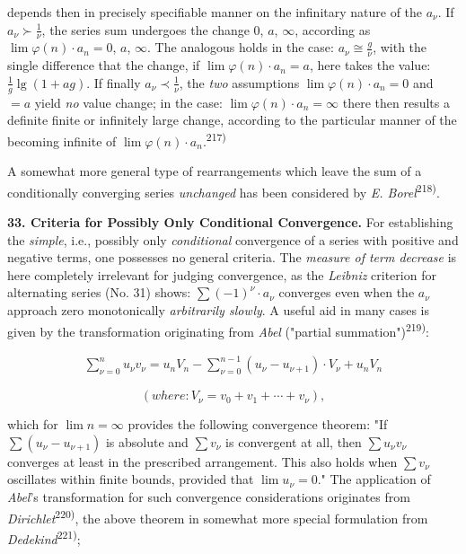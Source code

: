 \thispagestyle{fancy}

\vspace{0.5cm}

depends then in precisely specifiable manner on the infinitary nature of the $a_\nu$. If $a_\nu \succ \frac{1}{\nu}$, the series sum undergoes the change $0$, $a$, $\infty$, according as $\lim \varphi(n) \cdot a_n = 0$, $a$, $\infty$. The analogous holds in the case: $a_\nu \cong \frac{g}{\nu}$, with the single difference that the change, if $\lim \varphi(n) \cdot a_n = a$, here takes the value: $\frac{1}{g} \lg(1 + ag)$. If finally $a_\nu \prec \frac{1}{\nu}$, the \textit{two} assumptions $\lim \varphi(n) \cdot a_n = 0$ and $= a$ yield \textit{no} value change; in the case: $\lim \varphi(n) \cdot a_n = \infty$ there then results a definite finite or infinitely large change, according to the particular manner of the becoming infinite of $\lim \varphi(n) \cdot a_n$.\textsuperscript{217)}

A somewhat more general type of rearrangements which leave the sum of a conditionally converging series \textit{unchanged} has been considered by \textit{E. Borel}\textsuperscript{218)}.

\vspace{0.3cm}
\textbf{33. Criteria for Possibly Only Conditional Convergence.} For establishing the \textit{simple}, i.e., possibly only \textit{conditional} convergence of a series with positive and negative terms, one possesses no general criteria. The \textit{measure of term decrease} is here completely irrelevant for judging convergence, as the \textit{Leibniz} criterion for alternating series (No. 31) shows: $\sum (-1)^\nu \cdot a_\nu$ converges even when the $a_\nu$ approach zero monotonically \textit{arbitrarily slowly}. A useful aid in many cases is given by the transformation originating from \textit{Abel} ("partial summation")\textsuperscript{219)}:

\vspace{-0.5cm}
\begin{align}
    \sum_{\nu=0}^{n} u_\nu v_\nu = u_n V_n - \sum_{\nu=0}^{n-1} (u_{\nu} - u_{\nu+1}) \cdot V_\nu + u_n V_n
\end{align}

\vspace{-0.3cm}
$$(where: V_\nu = v_0 + v_1 + \cdots + v_\nu),$$ 

which for $\lim n = \infty$ provides the following convergence theorem: "If $\sum (u_\nu - u_{\nu+1})$ is absolute and $\sum v_\nu$ is convergent at all, then $\sum u_\nu v_\nu$ converges at least in the prescribed arrangement. This also holds when $\sum v_\nu$ oscillates within finite bounds, provided that $\lim u_\nu = 0$." The application of \textit{Abel}'s transformation for such convergence considerations originates from \textit{Dirichlet}\textsuperscript{220)}, the above theorem in somewhat more special formulation from \textit{Dedekind}\textsuperscript{221)};

